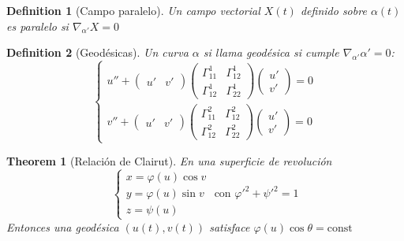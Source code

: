 \documentclass[leqno]{article}
\newtheorem*{definition}{Definition}
\newtheorem*{theorem}{Theorem}
\begin{document}
\begin{definition}[Campo paralelo]
Un campo vectorial $X(t)$ definido sobre $\alpha (t)$ es paralelo si $\nabla _{\alpha'}X=0$ 
\end{definition}

\begin{definition}[Geodésicas]
Un curva $\alpha $ si llama geodésica si cumple $\nabla _{\alpha '}\alpha ' = 0$:
\[
  \begin{cases}
   u'' + \begin{pmatrix} u' & v' \end{pmatrix} \begin{pmatrix} \Gamma_{11}^1 & \Gamma _{12}^1 \\ \Gamma _{12}^1 & \Gamma_{22}^1 \end{pmatrix} \begin{pmatrix} u' \\ v' \end{pmatrix} =0  \\
  v'' + \begin{pmatrix} u' & v' \end{pmatrix} \begin{pmatrix} \Gamma _{11}^2 & \Gamma _{12}^2 \\ \Gamma _{12}^2 & \Gamma _{22}^2 \end{pmatrix} \begin{pmatrix} u' \\ v' \end{pmatrix} = 0
  \end{cases}
\] 
\end{definition}

\begin{theorem}[Relación de Clairut]
En una superficie de revolución
\[
\begin{cases}
  x = \varphi (u)\cos v\\
  y = \varphi (u)\sin v \\
  z = \psi (u)
\end{cases}
\text{ con } \varphi '^2 + \psi '^2 = 1
\] 
Entonces una geodésica $(u(t), v(t))$ satisface $\varphi (u)\cos \theta = \text{const}$
\end{theorem}
\end{document}
